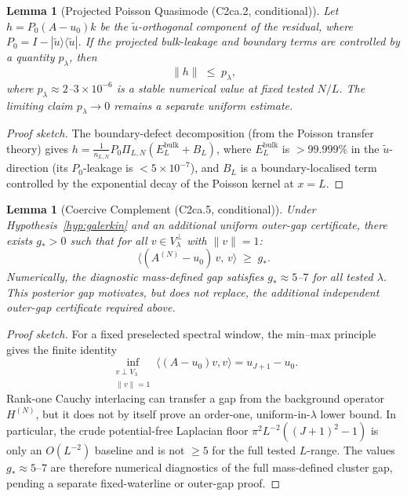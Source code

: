 \documentclass[11pt,a4paper]{article}
\theoremstyle{plain}
\newtheorem{lemma}[theorem]{Lemma}
\theoremstyle{definition}
\begin{document}
\begin{lemma}[Projected Poisson Quasimode (C2ca.2, conditional)]
\label{lem:projected}
Let $h = P_0(A-u_0)k$ be the $\tilde{u}$-orthogonal component of
the residual, where $P_0 = I - |\tilde{u}\rangle\langle\tilde{u}|$.
If the projected bulk-leakage and boundary terms are controlled by a
quantity $p_\lambda$, then
\[
  \|h\| \;\leq\; p_\lambda,
\]
where $p_\lambda \approx 2$--$3 \times 10^{-6}$ is a
stable numerical value at fixed tested $N/L$.  The limiting claim
$p_\lambda\to0$ remains a separate uniform estimate.
\end{lemma}

\begin{proof}[Proof sketch]
The boundary-defect decomposition (from the Poisson transfer theory)
gives $h = \frac{1}{n_{L,N}} P_0 \Pi_{L,N}(E_L^{\mathrm{bulk}}
+ B_L)$, where $E_L^{\mathrm{bulk}}$ is $> 99.999\%$ in the
$\tilde{u}$-direction (its $P_0$-leakage is $< 5 \times 10^{-7}$),
and $B_L$ is a boundary-localised term controlled by the
exponential decay of the Poisson kernel at $x = L$.
\end{proof}

\begin{lemma}[Coercive Complement (C2ca.5, conditional)]
\label{lem:coercive}
Under Hypothesis~\ref{hyp:galerkin} and an additional uniform
outer-gap certificate, there exists $g_* > 0$ such that for all
$v \in V_\lambda^\perp$ with $\|v\| = 1$:
\[
  \langle (A^{(N)} - u_0)\, v,\, v\rangle \;\geq\; g_*.
\]
Numerically, the diagnostic mass-defined gap satisfies
$g_* \approx 5$--$7$ for all tested $\lambda$.  This posterior gap
motivates, but does not replace, the additional independent outer-gap
certificate required above.
\end{lemma}

\begin{proof}[Proof sketch]
For a fixed preselected spectral window, the min--max principle gives
the finite identity
\[
  \inf_{\substack{v\perp V_\lambda\\ \|v\|=1}}
  \langle(A-u_0)v,v\rangle = u_{J+1}-u_0 .
\]
Rank-one Cauchy interlacing can transfer a gap from the background
operator $H^{(N)}$, but it does not by itself prove an order-one,
uniform-in-$\lambda$ lower bound.  In particular, the crude
potential-free Laplacian floor
$\pi^2 L^{-2}((J+1)^2-1)$ is only an $O(L^{-2})$ baseline and is not
$\geq5$ for the full tested $L$-range.  The values $g_*\approx5$--$7$
are therefore numerical diagnostics of the full mass-defined cluster
gap, pending a separate fixed-waterline or outer-gap proof.
\end{proof}
\end{document}
